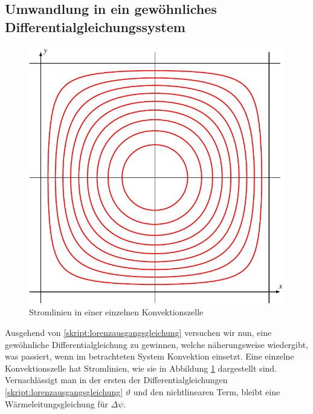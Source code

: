 \subsection{Umwandlung in ein gewöhnliches Differentialgleichungssystem\label{subsection:umwandlung}}
\begin{figure}
\centering
\includegraphics{chapters/2/konvektion.pdf}
\caption{Stromlinien in einer einzelnen Konvektionszelle
\label{skript:stromlinien konvektion}}
\end{figure}
Ausgehend von
\eqref{skript:lorenzausgangsgleichung}
versuchen wir nun, eine gewöhnliche Differentialgleichung zu gewinnen,
welche näherungsweise wiedergibt, was passiert, wenn im betrachteten
System Konvektion einsetzt.
Eine einzelne Konvektionszelle hat Stromlinien, wie sie in Abbildung
\ref{skript:stromlinien konvektion}
dargestellt sind.
Vernachlässigt man in der ersten der Differentialgleichungen
\eqref{skript:lorenzausgangsgleichung}
$\vartheta$ und den nichtlinearen Term, bleibt eine Wärmeleitungsgleichung
für $\Delta \psi$.
